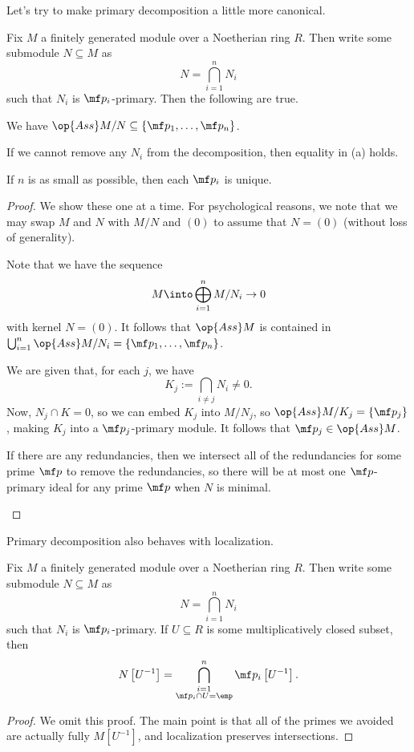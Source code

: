 Let's try to make primary decomposition a little more canonical.
\begin{theorem}
	Fix $M$ a finitely generated module over a Noetherian ring $R$. Then write some submodule $N\subseteq M$ as
	\[N=\bigcap_{i=1}^nN_i\]
	such that $N_i$ is $\mf p_i$-primary. Then the following are true.
	\begin{listalph}
		\item We have $\op{Ass}M/N\subseteq\{\mf p_1,\ldots,\mf p_n\}$.
		\item If we cannot remove any $N_i$ from the decomposition, then equality in (a) holds.
		\item If $n$ is as small as possible, then each $\mf p_i$ is unique.
	\end{listalph}
\end{theorem}
\begin{proof}
	We show these one at a time. For psychological reasons, we note that we may swap $M$ and $N$ with $M/N$ and $(0)$ to assume that $N=(0)$ (without loss of generality).
	\begin{listalph}
		\item Note that we have the sequence
		\[M\into\bigoplus_{i=1}^nM/N_i\to 0\]
		with kernel $N=(0)$. It follows that $\op{Ass}M$ is contained in $\bigcup_{i=1}^n\op{Ass}M/N_i=\{\mf p_1,\ldots,\mf p_n\}$.
		\item We are given that, for each $j$, we have
		\[K_j:=\bigcap_{i\ne j}N_i\ne0.\]
		Now, $N_j\cap K=0$, so we can embed $K_j$ into $M/N_j$, so $\op{Ass}M/K_j=\{\mf p_j\}$, making $K_j$ into a $\mf p_j$-primary module. It follows that $\mf p_j\in\op{Ass}M$.
		\item If there are any redundancies, then we intersect all of the redundancies for some prime $\mf p$ to remove the redundancies, so there will be at most one $\mf p$-primary ideal for any prime $\mf p$ when $N$ is minimal.
		\qedhere
	\end{listalph}
\end{proof}
Primary decomposition also behaves with localization.
\begin{theorem}
	Fix $M$ a finitely generated module over a Noetherian ring $R$. Then write some submodule $N\subseteq M$ as
	\[N=\bigcap_{i=1}^nN_i\]
	such that $N_i$ is $\mf p_i$-primary. If $U\subseteq R$ is some multiplicatively closed subset, then
	\[N\left[U^{-1}\right]=\bigcap_{\substack{i=1\\\mf p_i\cap U=\emp}}^n\mf p_i\left[U^{-1}\right].\]
\end{theorem}
\begin{proof}
	We omit this proof. The main point is that all of the primes we avoided are actually fully $M\left[U^{-1}\right]$, and localization preserves intersections.
\end{proof}

